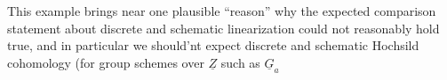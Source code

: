 This example brings near one plausible ``reason'' why the expected
comparison statement about discrete and schematic linearization could not
reasonably hold true,  and in particular we should'nt expect discrete and
schematic Hochsild cohomology (for group schemes over $\underline{Z}$  such as $\underline{G}_a$


